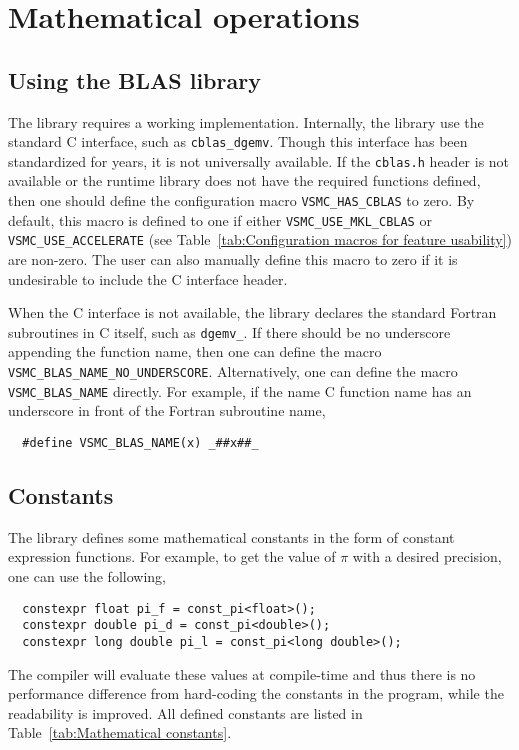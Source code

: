\chapter{Mathematical operations}
\label{chap:Mathemtical operations}

\section{Using the BLAS library}
\label{sec:Using the BLAS library}

The library requires a working \blas implementation. Internally, the library
use the standard C interface, such as \verb|cblas_dgemv|. Though this interface
has been standardized for years, it is not universally available. If the
\verb|cblas.h| header is not available or the runtime library does not have the
required functions defined, then one should define the configuration macro
\verb|VSMC_HAS_CBLAS| to zero. By default, this macro is defined to one if
either \verb|VSMC_USE_MKL_CBLAS| or \verb|VSMC_USE_ACCELERATE| (see
Table~\ref{tab:Configuration macros for feature usability}) are non-zero. The
user can also manually define this macro to zero if it is undesirable to
include the C interface header.

When the C interface is not available, the library declares the standard
Fortran subroutines in C itself, such as \verb|dgemv_|. If there should be no
underscore appending the function name, then one can define the macro
\verb|VSMC_BLAS_NAME_NO_UNDERSCORE|. Alternatively, one can define the macro
\verb|VSMC_BLAS_NAME| directly. For example, if the name C function name has
an underscore in front of the Fortran subroutine name,
\begin{Verbatim}
  #define VSMC_BLAS_NAME(x) _##x##_
\end{Verbatim}

\section{Constants}
\label{sec:Constants}

The library defines some mathematical constants in the form of constant
expression functions. For example, to get the value of $\pi$ with a desired
precision, one can use the following,
\begin{Verbatim}
  constexpr float pi_f = const_pi<float>();
  constexpr double pi_d = const_pi<double>();
  constexpr long double pi_l = const_pi<long double>();
\end{Verbatim}
The compiler will evaluate these values at compile-time and thus there is no
performance difference from hard-coding the constants in the program, while the
readability is improved. All defined constants are listed in
Table~\ref{tab:Mathematical constants}.

